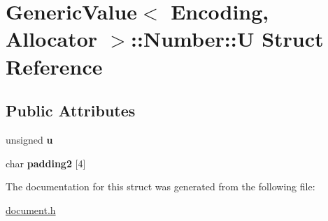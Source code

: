 \hypertarget{a02104}{}\section{Generic\+Value$<$ Encoding, Allocator $>$\+:\+:Number\+:\+:U Struct Reference}
\label{a02104}
\subsection*{Public Attributes}
\begin{DoxyCompactItemize}
\item 
\mbox{\label{a02104_a175e3a2bd43e6880791eb7c950d2f147}} 
unsigned {\bfseries u}
\item 
\mbox{\label{a02104_a9341f65c1645f24fd001a1ebf58d3c5b}} 
char {\bfseries padding2} \mbox{[}4\mbox{]}
\end{DoxyCompactItemize}


The documentation for this struct was generated from the following file\+:\begin{DoxyCompactItemize}
\item 
\hyperlink{a00476}{document.\+h}\end{DoxyCompactItemize}
